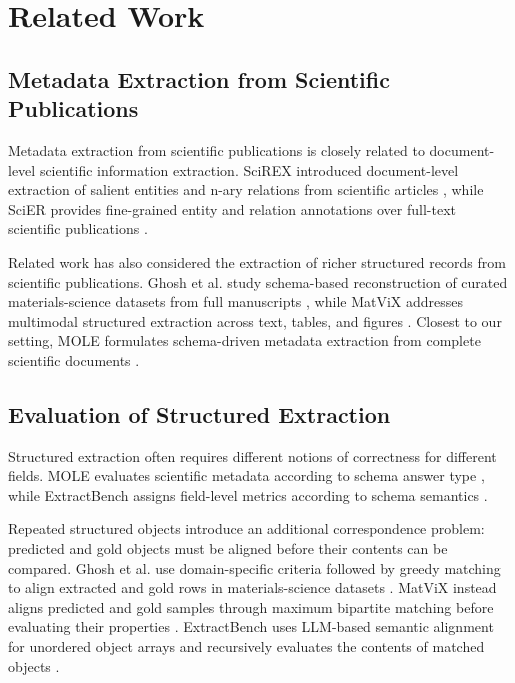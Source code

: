 \section{Related Work}
\label{sec:related-work}

\subsection{Metadata Extraction from Scientific Publications}

Metadata extraction from scientific publications is closely related to
document-level scientific information extraction. SciREX introduced
document-level extraction of salient entities and n-ary relations from
scientific articles \citep{jain2020scirex}, while SciER provides fine-grained
entity and relation annotations over full-text scientific publications
\citep{zhang2024scier}.

Related work has also considered the extraction of richer structured records
from scientific publications. Ghosh et al. study schema-based reconstruction
of curated materials-science datasets from full manuscripts
\citep{ghosh2024reliable}, while MatViX addresses multimodal structured
extraction across text, tables, and figures
\citep{khalighinejad2025matvix}. Closest to our setting, MOLE formulates
schema-driven metadata extraction from complete scientific documents
\citep{alyafeai2025mole}.

\subsection{Evaluation of Structured Extraction}

Structured extraction often requires different notions of correctness for
different fields. MOLE evaluates scientific metadata according to schema
answer type \citep{alyafeai2025mole}, while ExtractBench assigns field-level
metrics according to schema semantics \citep{ferguson2026extractbench}.

Repeated structured objects introduce an additional correspondence problem:
predicted and gold objects must be aligned before their contents can be
compared. Ghosh et al. use domain-specific criteria followed by greedy
matching to align extracted and gold rows in materials-science datasets
\citep{ghosh2024reliable}. MatViX instead aligns predicted and gold samples
through maximum bipartite matching before evaluating their properties
\citep{khalighinejad2025matvix}. ExtractBench uses LLM-based semantic alignment
for unordered object arrays and recursively evaluates the contents of matched
objects \citep{ferguson2026extractbench}.

